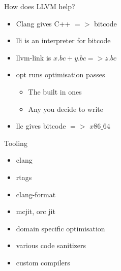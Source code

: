 \documentclass[20pt]{beamer}
\begin{document}
{
  \begin{frame}[plain]
  \end{frame}
}

\begin{frame}{How does LLVM help?}
  \begin{itemize}
  \item Clang gives C++ $=>$ bitcode
  \item lli is an interpreter for bitcode
  \item llvm-link is $x.bc + y.bc => z.bc$
  \item opt runs optimisation passes
    \begin{itemize}
    \item The built in ones
    \item Any you decide to write
    \end{itemize}
  \item llc gives bitcode $=>$ $x86\_64$
  \end{itemize}
\end{frame}

\begin{frame}{Tooling}
  \begin{itemize}
  \item clang
  \item rtags
  \item clang-format
  \item mcjit, orc jit
  \item domain specific optimisation
  \item various code sanitizers
  \item custom compilers
  \end{itemize}
\end{frame}
\end{document}
